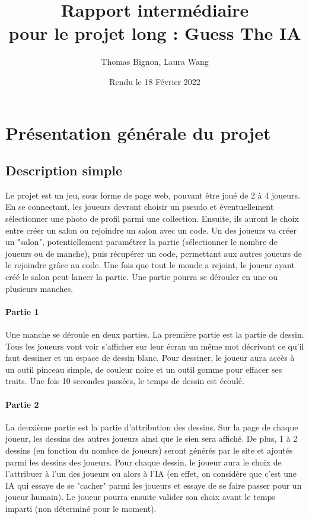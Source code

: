 \documentclass{article}
\title{Rapport intermédiaire \\ pour le projet long : Guess The IA}
\author{Thomas Bignon, Laura Wang}
\date{Rendu le 18 Février 2022}
\begin{document}
\maketitle


\section{Présentation générale du projet}

\subsection{Description simple}

Le projet est un jeu, sous forme de page web, pouvant être joué de 2 à 4 joueurs. En se connectant, les joueurs devront choisir un pseudo et éventuellement sélectionner une photo de profil parmi une collection. Ensuite, ils auront le choix entre créer un salon ou rejoindre un salon avec un code. Un des joueurs va créer un "salon", potentiellement paramétrer la partie (sélectionner le nombre de joueurs ou de manche), puis récupérer un code, permettant aux autres joueurs de le rejoindre grâce au code. Une fois que tout le monde a rejoint, le joueur ayant créé le salon peut lancer la partie. Une partie pourra se dérouler en une ou plusieurs manches.

\paragraph{Partie 1} Une manche se déroule en deux parties. La première partie est la partie de dessin. Tous les joueurs vont voir s'afficher sur leur écran un même mot décrivant ce qu'il faut dessiner et un espace de dessin blanc. Pour dessiner, le joueur aura accès à un outil pinceau simple, de couleur noire et un outil gomme pour effacer ses traits. Une fois 10 secondes passées, le temps de dessin est écoulé.

\paragraph{Partie 2}  La deuxième partie est la partie d'attribution des dessins. Sur la page de chaque joueur, les dessins des autres joueurs ainsi que le sien sera affiché. De plus, 1 à 2 dessins (en fonction du nombre de joueurs) seront générés par le site et ajoutés parmi les dessins des joueurs. Pour chaque dessin, le joueur aura le choix de l'attribuer à l'un des joueurs ou alors à l'IA (en effet, on considère que c'est une IA qui essaye de se "cacher" parmi les joueurs et essaye de se faire passer pour un joueur humain). Le joueur pourra ensuite valider son choix avant le temps imparti (non déterminé pour le moment).
\end{document}
